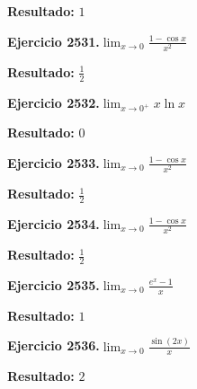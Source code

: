 \documentclass[10pt,a4paper]{article}
\begin{document}
\begin{solbox}
\textbf{Resultado:} \(\displaystyle 1\)
\end{solbox}

\begin{ejbox}
\textbf{Ejercicio 2531.}\quad $\lim_{x\to 0} \frac{1-\cos x}{x^2}$
\end{ejbox}

\begin{solbox}
\textbf{Resultado:} \(\displaystyle \frac{1}{2}\)
\end{solbox}

\newpage
\begin{ejbox}
\textbf{Ejercicio 2532.}\quad $\lim_{x\to 0^+} x\ln x$
\end{ejbox}

\begin{solbox}
\textbf{Resultado:} \(\displaystyle 0\)
\end{solbox}

\begin{ejbox}
\textbf{Ejercicio 2533.}\quad $\lim_{x\to 0} \frac{1-\cos x}{x^2}$
\end{ejbox}

\begin{solbox}
\textbf{Resultado:} \(\displaystyle \frac{1}{2}\)
\end{solbox}

\begin{ejbox}
\textbf{Ejercicio 2534.}\quad $\lim_{x\to 0} \frac{1-\cos x}{x^2}$
\end{ejbox}

\begin{solbox}
\textbf{Resultado:} \(\displaystyle \frac{1}{2}\)
\end{solbox}

\newpage
\begin{ejbox}
\textbf{Ejercicio 2535.}\quad $\lim_{x\to 0} \frac{e^x-1}{x}$
\end{ejbox}

\begin{solbox}
\textbf{Resultado:} \(\displaystyle 1\)
\end{solbox}

\begin{ejbox}
\textbf{Ejercicio 2536.}\quad $\lim_{x\to 0} \frac{\sin(2x)}{x}$
\end{ejbox}

\begin{solbox}
\textbf{Resultado:} \(\displaystyle 2\)
\end{solbox}
\end{document}
